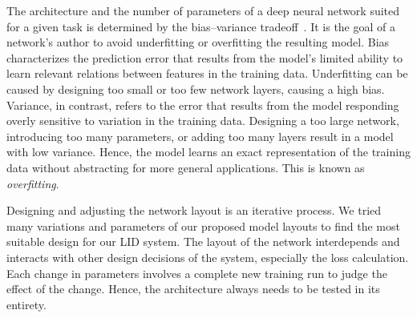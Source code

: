 The architecture and the number of parameters of a deep neural network suited for a given task is determined by the bias--variance tradeoff~\cite{geman1992neural}. It is the goal of a network's author to avoid underfitting or overfitting the resulting model. Bias characterizes the prediction error that results from the model's limited ability to learn relevant relations between features in the training data. Underfitting can be caused by designing too small or too few network layers, causing a high bias. Variance, in contrast, refers to the error that results from the model responding overly sensitive to variation in the training data. Designing a too large network, introducing too many parameters, or adding too many layers result in a model with low variance. Hence, the model learns an exact representation of the training data without abstracting for more general applications. This is known as \emph{overfitting}.

Designing and adjusting the network layout is an iterative process. We tried many variations and parameters of our proposed model layouts to find the most suitable design for our LID system. The layout of the network interdepends and interacts with other design decisions of the system, especially the loss calculation. Each change in parameters involves a complete new training run to judge the effect of the change. Hence, the architecture always needs to be tested in its entirety.

